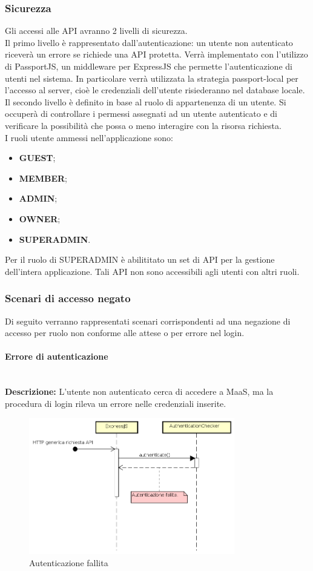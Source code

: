 \subsubsection{Sicurezza}
Gli accessi alle API avranno 2 livelli di sicurezza. \\
Il primo livello è rappresentato dall'autenticazione: un utente non autenticato riceverà un errore se richiede una API protetta. Verrà implementato con l'utilizzo di PassportJS, un middleware per ExpressJS che permette l'autenticazione di utenti nel sistema. In particolare verrà utilizzata la strategia passport-local per l'accesso al server, cioè le credenziali dell'utente risiederanno nel database locale. \\
Il secondo livello è definito in base al ruolo di appartenenza di un utente. Si occuperà di controllare i permessi assegnati ad un utente autenticato e di verificare la possibilità che possa o meno interagire con la risorsa richiesta. \\
I ruoli utente ammessi nell'applicazione sono: 
\begin{itemize}
\item \textbf{GUEST};
\item \textbf{MEMBER};
\item \textbf{ADMIN};
\item \textbf{OWNER};
\item \textbf{SUPERADMIN}.
\end{itemize}
Per il ruolo di SUPERADMIN è abilititato un set di API per la gestione dell'intera applicazione. Tali API non sono accessibili agli utenti con altri ruoli.
\newpage
\subsubsection{Scenari di accesso negato}
Di seguito verranno rappresentati scenari corrispondenti ad una negazione di accesso per ruolo non conforme alle attese o per errore nel login.
\paragraph{Errore di autenticazione}  \mbox{} \\
\textbf{Descrizione:} L'utente non autenticato cerca di accedere a MaaS, ma la procedura di login rileva un errore nelle credenziali inserite.
\begin{figure}[H]
\centering
\includegraphics[width=0.8\textwidth]{res/sections/backend/sequence/autenticazioneFallita.png}
\caption{Autenticazione fallita}
\end{figure}
